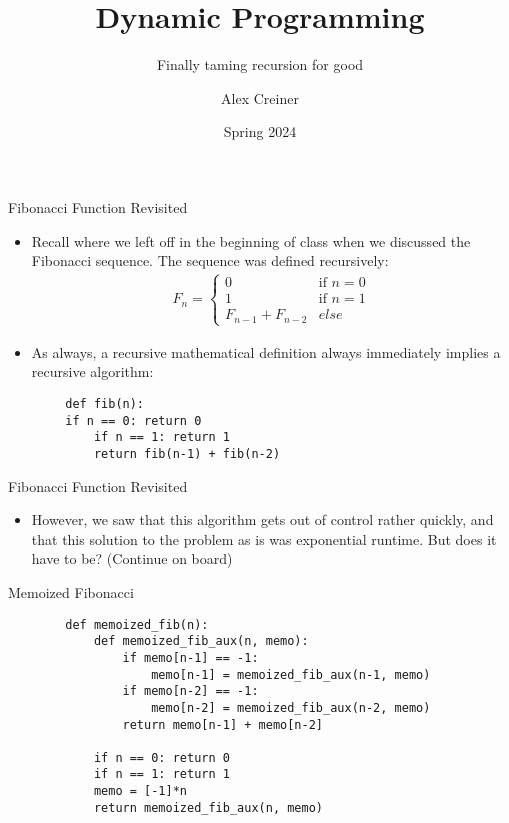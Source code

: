\documentclass{beamer}
\title{Dynamic Programming}
\subtitle{Finally taming recursion for good}
\author{Alex Creiner}
\institute{Boston College}
\date{Spring 2024}
\begin{document}
\titlepage
\begin{frame}[fragile]{Fibonacci Function Revisited}
    \begin{itemize}
        \item Recall where we left off in the beginning of class when we discussed the Fibonacci sequence. The sequence was defined recursively:
        \begin{align*}
            F_{n}= \begin{cases} 0 & \textrm{if } n = 0 \\ 1 & \textrm{if } n = 1 \\ F_{n-1} + F_{n-2} & else \end{cases} 
        \end{align*}
        \item As always, a recursive mathematical definition always immediately implies a recursive algorithm:
    \end{itemize}
    \begin{verbatim}
        def fib(n):
	    if n == 0: return 0
            if n == 1: return 1
            return fib(n-1) + fib(n-2)
    \end{verbatim}
\end{frame}

\begin{frame}{Fibonacci Function Revisited}
    \begin{itemize}
        \item However, we saw that this algorithm gets out of control rather quickly, and that this solution to the problem as is was exponential runtime. But does it have to be? (Continue on board) \pause 
    \end{itemize}
\end{frame}

\begin{frame}[fragile]{Memoized Fibonacci}
    \begin{verbatim}
        def memoized_fib(n):
            def memoized_fib_aux(n, memo):
                if memo[n-1] == -1:
                    memo[n-1] = memoized_fib_aux(n-1, memo)
                if memo[n-2] == -1:
                    memo[n-2] = memoized_fib_aux(n-2, memo)
                return memo[n-1] + memo[n-2]

            if n == 0: return 0
            if n == 1: return 1
            memo = [-1]*n 
            return memoized_fib_aux(n, memo)
    \end{verbatim}
\end{frame}
\end{document}
